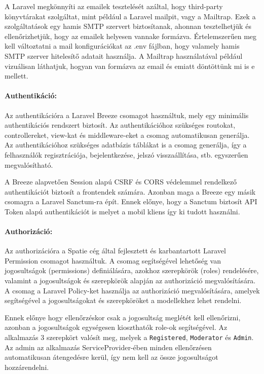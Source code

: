 A Laravel megkönnyíti az emailek tesztelését azáltal, hogy third-party könyvtárakat szolgáltat, mint például a Laravel mailpit, vagy a Mailtrap. Ezek a szolgáltatások egy hamis SMTP szervert biztosítanak, ahonnan tesztelhetjük és ellenőrizhetjük, hogy az emailek helyesen vannak\-e formázva. Értelemszerűen meg kell változtatni a mail konfigurációkat az .env fájlban, hogy valamely hamis SMTP szerver hitelesítő adatait használja. A Mailtrap használatával például vizuálisan láthatjuk, hogyan van formázva az email és emiatt döntöttünk mi is e mellett.


\paragraph{Authentikáció:} Az authentikációra a Laravel Breeze \cite{LaravelBreeze} csomagot használtuk, mely egy minimális authentikációs rendszert biztosít. Az authentikációhoz szükséges routokat, controllereket, view-kat és middleware-eket a csomag automatikusan generálja. Az authentikációhoz szükséges adatbázis táblákat is a csomag generálja, így a felhasználók regisztrációja, bejelentkezése, jelszó visszaállítása, stb. egyszerűen megvalósítható.

A Breeze alapvetően Session alapú CSRF és CORS védelemmel rendelkező authentikációt biztosít a frontendek számára. Azonban maga a Breeze egy másik csomagra a Laravel Sanctum-ra \cite{LaravelSanctum} épít. Ennek előnye, hogy a Sanctum biztosít API Token alapú authentikációt is melyet a mobil kliens így ki tudott használni.\\

\paragraph{Authorizáció:} Az authorizációra a Spatie cég által fejlesztett és karbantartott Laravel Permission csomagot \cite{LaravelPermissions} használtuk. A csomag segítségével lehetőség van jogosultságok (permissions) definiálására, azokhoz szerepkörök (roles) rendelésére, valamint a jogosultságok és szerepkörök alapján az authorizáció megvalósítására. A csomag a Laravel Policy-ket használja az authorizáció megvalósítására, amelyek segítségével a jogosultságokat és szerepköröket a modellekhez lehet rendelni.

Ennek előnye hogy ellenőrzéskor csak a jogosultság meglétét kell ellenőrizni, azonban a jogosultságok egységesen kioszthatók role-ok segítségével. Az alkalmazás 3 szerepkört valósít meg, melyek a \texttt{Registered}, \texttt{Moderator} és \texttt{Admin}. Az admin az alkalmazás ServiceProvider-ében minden ellenőrzésen automatikusan átengedésre kerül, így nem kell az össze jogosultságot hozzárendelni.\\


